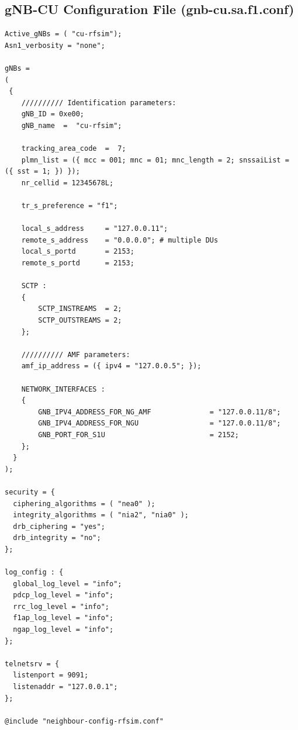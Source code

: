 \newpage
\subsection{gNB-CU Configuration File (gnb-cu.sa.f1.conf)}
\begin{lstlisting}[style=confstyle, caption=gnb-cu.sa.f1.conf configuration]
Active_gNBs = ( "cu-rfsim");
Asn1_verbosity = "none";

gNBs =
(
 {
    ////////// Identification parameters:
    gNB_ID = 0xe00;
    gNB_name  =  "cu-rfsim";

    tracking_area_code  =  7;
    plmn_list = ({ mcc = 001; mnc = 01; mnc_length = 2; snssaiList = ({ sst = 1; }) });
    nr_cellid = 12345678L;

    tr_s_preference = "f1";

    local_s_address     = "127.0.0.11";
    remote_s_address    = "0.0.0.0"; # multiple DUs
    local_s_portd       = 2153;
    remote_s_portd      = 2153;

    SCTP :
    {
        SCTP_INSTREAMS  = 2;
        SCTP_OUTSTREAMS = 2;
    };

    ////////// AMF parameters:
    amf_ip_address = ({ ipv4 = "127.0.0.5"; });

    NETWORK_INTERFACES :
    {
        GNB_IPV4_ADDRESS_FOR_NG_AMF              = "127.0.0.11/8";
        GNB_IPV4_ADDRESS_FOR_NGU                 = "127.0.0.11/8";
        GNB_PORT_FOR_S1U                         = 2152;
    };
  }
);

security = {
  ciphering_algorithms = ( "nea0" );
  integrity_algorithms = ( "nia2", "nia0" );
  drb_ciphering = "yes";
  drb_integrity = "no";
};

log_config : {
  global_log_level = "info";
  pdcp_log_level = "info";
  rrc_log_level = "info";
  f1ap_log_level = "info";
  ngap_log_level = "info";
};

telnetsrv = {
  listenport = 9091;
  listenaddr = "127.0.0.1";
};

@include "neighbour-config-rfsim.conf"
\end{lstlisting}

\newpage
